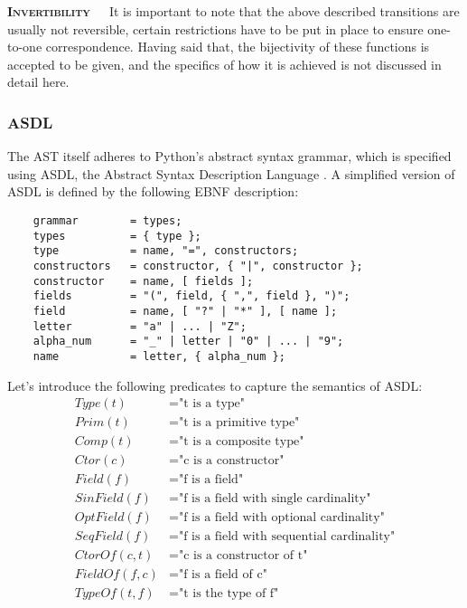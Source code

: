 \textbf{\textsc{Invertibility}}\ \ \ It is important to note that the above described transitions
are usually not reversible, certain restrictions have to be put in place to ensure one-to-one
correspondence. Having said that, the bijectivity of these functions is accepted to be given,
and the specifics of how it is achieved is not discussed in detail here.

\subsubsection{ASDL}

The AST itself adheres to Python's abstract syntax grammar, which is specified using
ASDL, the Abstract Syntax Description Language \cite{WangAppelKornSerra1997}.
A simplified version of ASDL is defined by the following EBNF \cite{Wirth1977} description:

\begin{verbatim}
    grammar        = types;
    types          = { type };
    type           = name, "=", constructors;
    constructors   = constructor, { "|", constructor };
    constructor    = name, [ fields ];
    fields         = "(", field, { ",", field }, ")";
    field          = name, [ "?" | "*" ], [ name ];
    letter         = "a" | ... | "Z";
    alpha_num      = "_" | letter | "0" | ... | "9";
    name           = letter, { alpha_num };
\end{verbatim}

\noindent
Let's introduce the following predicates to capture the semantics of ASDL:
 \begin{equation}
 \begin{split}
    Type(t) &= \text{"t is a type"} \\
    Prim(t) &= \text{"t is a primitive type"} \\
    Comp(t) &= \text{"t is a composite type"} \\
    Ctor(c) &= \text{"c is a constructor"} \\
    Field(f) &= \text{"f is a field"} \\
    SinField(f) &= \text{"f is a field with single cardinality"} \\
    OptField(f) &= \text{"f is a field with optional cardinality"} \\
    SeqField(f) &= \text{"f is a field with sequential cardinality"} \\
    CtorOf(c, t) &= \text{"c is a constructor of t"} \\
    FieldOf(f, c) &= \text{"f is a field of c"} \\
    TypeOf(t, f) &= \text{"t is the type of f"}
 \end{split}
 \end{equation}

